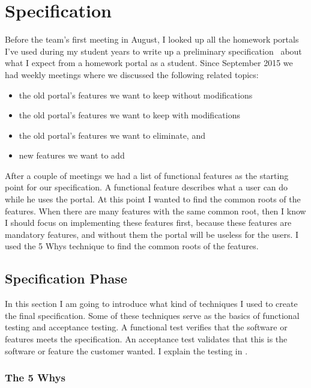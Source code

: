 \chapter{Specification}

Before the team's first meeting in August, I looked up all the homework portals I've used during my student years to write up a preliminary specification~\cite{Szepes-specification} about what I expect from a homework portal as a student. Since September 2015 we had weekly meetings where we discussed the following related topics: 

\begin{itemize}
	\item the old portal's features we want to keep without modifications
	\item the old portal's features we want to keep with modifications
	\item the old portal's features we want to eliminate, and
	\item new features we want to add
\end{itemize}

After a couple of meetings we had a list of functional features as the starting point for our specification. A functional feature describes what a user can do while he uses the portal. At this point I wanted to find the common roots of the features. When there are many features with the same common root, then I know I should focus on implementing these features first, because these features are mandatory features, and without them the portal will be useless for the users. I used the 5 Whys technique to find the common roots of the features. 

\section{Specification Phase}\label{spec-phase}
In this section I am going to introduce what kind of techniques I used to create the final specification. Some of these techniques serve as the basics of functional testing and acceptance testing. A functional test verifies that the software or features meets the specification. An acceptance test validates that this is the software or feature the customer wanted. I explain the testing in . 

\subsection{The 5 Whys}
\label{5-whys}

